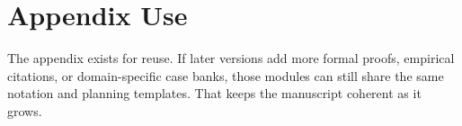 \section{Appendix Use}

The appendix exists for reuse. If later versions add more formal proofs,
empirical citations, or domain-specific case banks, those modules can still
share the same notation and planning templates. That keeps the manuscript
coherent as it grows.
